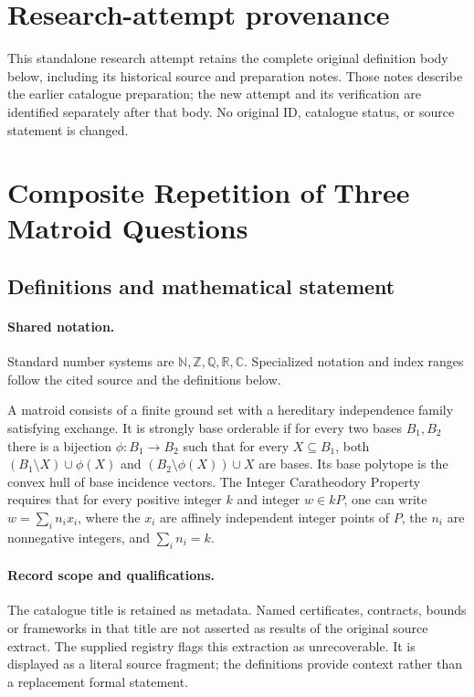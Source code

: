 \documentclass[11pt]{article}
\begin{document}
\section*{Research-attempt provenance}
This standalone research attempt retains the complete original definition body below,
including its historical source and preparation notes. Those notes describe the
earlier catalogue preparation; the new attempt and its verification are identified
separately after that body. No original ID, catalogue status, or source statement is changed.

\section{Composite Repetition of Three Matroid Questions}\label{statement}

\subsection{Definitions and mathematical statement}

\paragraph{Shared notation.}Standard number systems are $\mathbb N,\mathbb Z,\mathbb Q,\mathbb R,\mathbb C$. Specialized notation and index ranges follow the cited source and the definitions below.


A matroid consists of a finite ground set with a hereditary independence family satisfying exchange. It is strongly base orderable if for every two bases $B_1,B_2$ there is a bijection $\phi:B_1\to B_2$ such that for every $X\subseteq B_1$, both $(B_1\setminus X)\cup\phi(X)$ and $(B_2\setminus\phi(X))\cup X$ are bases. Its base polytope is the convex hull of base incidence vectors. The Integer Caratheodory Property requires that for every positive integer $k$ and integer $w\in kP$, one can write $w=\sum_i n_ix_i$, where the $x_i$ are affinely independent integer points of $P$, the $n_i$ are nonnegative integers, and $\sum_i n_i=k$.
\paragraph{Record scope and qualifications.}
The catalogue title is retained as metadata. Named certificates, contracts, bounds or frameworks in that title are not asserted as results of the original source extract.
The supplied registry flags this extraction as unrecoverable. It is displayed as a literal source fragment; the definitions provide context rather than a replacement formal statement.
\end{document}
